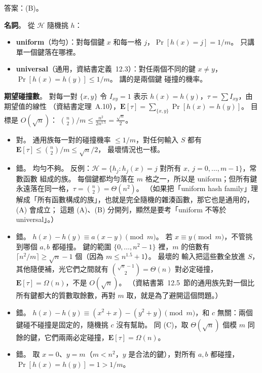 \begin{pastsoln}
答案：(B)。

\textbf{名詞}。 從 $\mathcal{H}$ 隨機挑 $h$：
\begin{itemize}
\item \textbf{uniform}（均勻）：對每個鍵 $x$ 和每一格 $j$，$\Pr[h(x) = j] = 1/m$。 只講單一個鍵落在哪裡。
\item \textbf{universal}（通用，資結書定義~12.3）：對任兩個不同的鍵 $x \ne y$，$\Pr[h(x) = h(y)] \le 1/m$。 講的是兩個鍵
碰撞的機率。
\end{itemize}

\textbf{期望碰撞數}。 對每一對 $\{x, y\}$ 令 $I_{xy} = 1$ 表示 $h(x) = h(y)$，$\tau = \sum I_{xy}$，由期望值的線性
（資結書定理~A.10），$\mathbf{E}[\tau] = \sum_{\{x, y\}} \Pr[h(x) = h(y)]$。 目標是 $O(\sqrt{n})$：
$\binom{n}{2} / m \le \frac{n^2}{2 n^{1.5}} = \frac{\sqrt{n}}{2}$。

\begin{itemize}
\item[(B)] 對。 通用族每一對的碰撞機率 $\le 1/m$，對任何輸入 $S$ 都有 $\mathbf{E}[\tau] \le \binom{n}{2}/m \le \sqrt{n}/2$，
最壞情況也一樣。
\item[(A)] 錯。 均勻不夠。 反例：$\mathcal{H} = \{h_j : h_j(x) = j \text{ 對所有 } x,\ j = 0, \ldots, m - 1\}$，常數函數
組成的族。 每個鍵都均勻落在 $m$ 格之一，所以是 uniform；但所有鍵永遠落在同一格，$\tau = \binom{n}{2} = \Theta(n^2)$。
（如果把「uniform hash family」理解成「所有函數構成的族」，也就是完全隨機的雜湊函數，那它也是通用的，(A) 會成立；
這題 (A)、(B) 分開列，顯然是要考「uniform 不等於 universal」。）
\item[(C)] 錯。 $h(x) - h(y) \equiv a(x - y) \pmod m$。 若 $x \equiv y \pmod m$，不管挑到哪個 $a, b$ 都碰撞。 鍵的範圍
$\{0, \ldots, n^2 - 1\}$ 裡，$m$ 的倍數有 $\lceil n^2/m \rceil \ge \sqrt{n} - 1$ 個（因為 $m \le n^{1.5} + 1$）。 最壞的
輸入把這些數全放進 $S$，其他隨便補，光它們之間就有 $\binom{\sqrt{n} - 1}{2} = \Theta(n)$ 對必定碰撞，
$\mathbf{E}[\tau] = \Omega(n)$，不是 $O(\sqrt{n})$。 （資結書第~12.5~節的通用族先對一個比所有鍵都大的質數取餘數，再對
$m$ 取，就是為了避開這個問題。）
\item[(D)] 錯。 $h(x) - h(y) \equiv (x^2 + x) - (y^2 + y) \pmod m$，和 $c$ 無關：兩個鍵碰不碰撞是固定的，隨機挑 $c$
沒有幫助。 同 (C)，取 $\Theta(\sqrt{n})$ 個模 $m$ 同餘的鍵，它們兩兩必定碰撞，$\mathbf{E}[\tau] = \Omega(n)$。
\item[(E)] 錯。 取 $x = 0$、$y = m$（$m < n^2$，$y$ 是合法的鍵），對所有 $a, b$ 都碰撞，$\Pr[h(x) = h(y)] = 1 > 1/m$。
\end{itemize}
\end{pastsoln}
